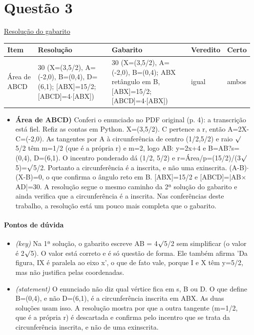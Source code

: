 \documentclass{article}%
\begin{document}
\section*{Questão 3}%
\href{https://poliedroresolve.sistemapoliedro.com.br/vestibulares/ita/2026/ita-2-fase-dia-1-28-10-2025-2-fase-dia-1/dissertativa-3-matematica-2-fase-dia-1-ita-2026}{Resolução do gabarito}\par\smallskip%
\begin{longtable}{@{}p{} p{} p{} p{} p{}@{}}\toprule Item & Resolução & Gabarito & Veredito & Certo \\ \midrule
Área de ABCD & 30 (X=(3,5/2), A=(-2,0), B=(0,4), D=(6,1); {[}ABX{]}=15/2; {[}ABCD{]}=4$\cdot${[}ABX{]}) & 30 (X=(3,5/2), A=(-2,0), B=(0,4); ABX retângulo em B, {[}ABX{]}=15/2; {[}ABCD{]}=4$\cdot${[}ABX{]}) & igual & ambos \\
\bottomrule\end{longtable}%
\begin{itemize}%
\item%
\textbf{Área de ABCD)} Conferi o enunciado no PDF original (p. 4): a transcrição está fiel. Refiz as contas em Python. X=(3,5/2). C pertence a r, então A=2X-C=(-2,0). As tangentes por A à circunferência de centro (1/2,5/2) e raio $\surd$5/2 têm m=1/2 (que é a própria r) e m=2, logo AB: y=2x+4 e B=AB?s=(0,4), D=(6,1). O incentro ponderado dá (1/2, 5/2) e r=Área/p=(15/2)/(3$\surd$5)=$\surd$5/2. Portanto a circunferência é a inscrita, e não uma exinscrita. (A-B)$\cdot$(X-B)=0, o que confirma o ângulo reto em B. {[}ABX{]}=15/2 e {[}ABCD{]}=|AB$\times$AD|=30. A resolução segue o mesmo caminho da 2ª solução do gabarito e ainda verifica que a circunferência é a inscrita. Nas conferências deste trabalho, a resolução está um pouco mais completa que o gabarito.%
\end{itemize}%
\paragraph{Pontos de dúvida}%
\begin{itemize}%
\item%
\textit{(key)} Na 1ª solução, o gabarito escreve AB = 4$\surd$5/2 sem simplificar (o valor é 2$\surd$5). O valor está correto e é só questão de forma. Ele também afirma 'Da figura, IX é paralela ao eixo x', o que de fato vale, porque I e X têm y=5/2, mas não justifica pelas coordenadas.%
\item%
\textit{(statement)} O enunciado não diz qual vértice fica em s, B ou D. O que define B=(0,4), e não D=(6,1), é a circunferência inscrita em ABX. As duas soluções usam isso. A resolução mostra por que a outra tangente (m=1/2, que é a própria r) é descartada e confirma pelo incentro que se trata da circunferência inscrita, e não de uma exinscrita.%
\end{itemize}%
\end{document}
